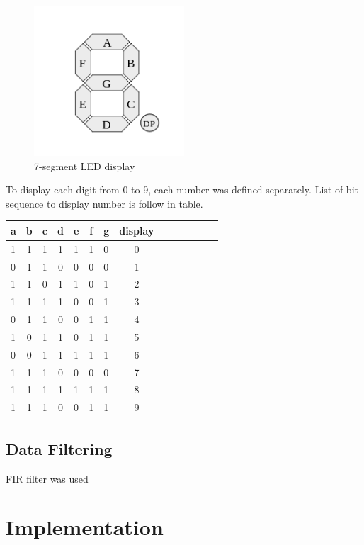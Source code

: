 \documentclass{article}
\begin{document}
\begin{figure}[h]
\begin{center}
\includegraphics[width=0.50\textwidth]{7segment} %
\caption{7-segment LED display}
\end{center}
\end{figure}
To display each digit from 0 to 9, each number was defined separately. List of bit sequence to display number is follow in table.
\begin{center}
\begin{tabular}{lclclclclclc|cl}
a&b&c&d&e&f&g&display\\
\hline
1&1&1&1&1&1&0&0\\
0&1&1&0&0&0&0&1\\
1&1&0&1&1&0&1&2\\
1&1&1&1&0&0&1&3\\
0&1&1&0&0&1&1&4\\
1&0&1&1&0&1&1&5\\
0&0&1&1&1&1&1&6\\
1&1&1&0&0&0&0&7\\
1&1&1&1&1&1&1&8\\
1&1&1&0&0&1&1&9
\end{tabular}
\end{center}

\subsection{Data Filtering}
FIR filter was used 



\section{Implementation}
\end{document}
